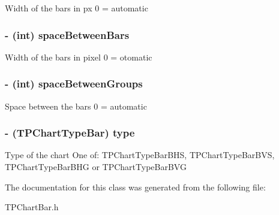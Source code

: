 Width of the bars in px 0 = automatic \hypertarget{interface_t_p_chart_bar_8ec908b88d8db83273578b53002f654d}{
\subsubsection[{spaceBetweenBars}]{\setlength{\rightskip}{0pt plus 5cm}- (int) spaceBetweenBars}}
\label{interface_t_p_chart_bar_8ec908b88d8db83273578b53002f654d}


Width of the bars in pixel 0 = otomatic \hypertarget{interface_t_p_chart_bar_2a66eac7dcb2b1f2445275af97d1955e}{
\subsubsection[{spaceBetweenGroups}]{\setlength{\rightskip}{0pt plus 5cm}- (int) spaceBetweenGroups}}
\label{interface_t_p_chart_bar_2a66eac7dcb2b1f2445275af97d1955e}


Space between the bars 0 = automatic \hypertarget{interface_t_p_chart_bar_a6097d677c850f54a0e8a513356130d0}{
\subsubsection[{type}]{\setlength{\rightskip}{0pt plus 5cm}- (TPChartTypeBar) type}}
\label{interface_t_p_chart_bar_a6097d677c850f54a0e8a513356130d0}


Type of the chart One of: TPChartTypeBarBHS, TPChartTypeBarBVS, TPChartTypeBarBHG or TPChartTypeBarBVG 

The documentation for this class was generated from the following file:\begin{CompactItemize}
\item 
TPChartBar.h\end{CompactItemize}
